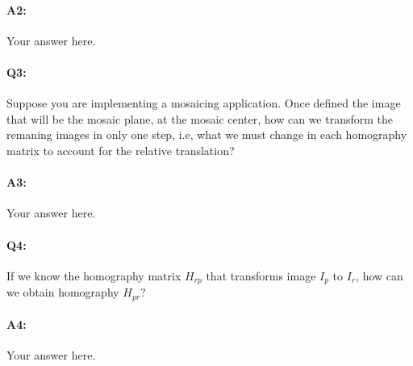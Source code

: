 \paragraph{A2:} Your answer here.




\pagebreak
\paragraph{Q3:} Suppose you are implementing a mosaicing application. Once defined the image that will be the mosaic plane, at the mosaic center, how can we transform the remaning images in only one step, i.e, what we must change in each homography matrix to account for the relative translation?

\paragraph{A3:} Your answer here.





\pagebreak
\paragraph{Q4:} If we know the homography matrix $H_{rp}$ that transforms image $I_p$ to $I_r$, how can we obtain homography $H_{pr}$?

\paragraph{A4:} Your answer here.










